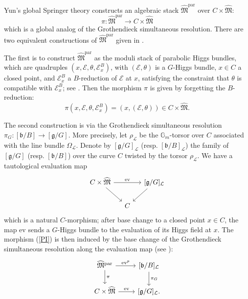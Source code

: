 \documentclass[11pt]{amsart}
\theoremstyle{plain}
\theoremstyle{definition}
\theoremstyle{remark}
\newcommand{\BG}{{\mathbb{G}}}
\newcommand{\CE}{{\mathcal E}}
\newcommand{\CL}{{\mathcal L}}
\newcommand{\FM}{{\mathfrak{M}}}
\begin{document}
Yun's global Springer theory \cite{Yun1} constructs an algebraic stack $\widehat{\FM}^\mathrm{par}$ over $C \times \widehat{\FM}$:
\begin{equation}\label{PI}
\pi: \widehat{\FM}^\mathrm{par} \to C \times \widehat{\FM}
\end{equation}
which is a global analog of the Grothendieck simultaneous resolution. There are two equivalent constructions of $\widehat{\FM}^{\mathrm{par}}$ given in \cite[Section 2.1]{Yun1}. 


The first is to construct $\widehat{\FM}^{\mathrm{par}}$ as the moduli stack of parabolic Higgs bundles, which are quadruples $(x, \CE, \theta, \CE_x^B)$, with $(\CE, \theta)$ is a $G$-Higgs bundle, $x\in C$ a closed point, and $\CE_x^B$ a $B$-reduction of $\CE$ at $x$, satisfying the constraint that $\theta$ is compatible with $\CE_x^B$; see \cite[Definition 2.1.1]{Yun1}. Then the morphism $\pi$ is given by forgetting the $B$-reduction:
\[
\pi (x, \CE, \theta, \CE_x^B)  = (x, (\CE,\theta)) \in C \times \widehat{\FM}.
\]

The second construction is via the Grothendieck simultaneous resolution $\pi_G: [\mathfrak{b}/B] \to [\mathfrak{g}/G]$. More precisely, let $\rho_\CL$ be the $\BG_m$-torsor over $C$ associated with the line bundle $\Omega_\CL$. Denote by $[\mathfrak{g}/G]_\CL$ (resp. $[\mathfrak{b}/B]_\CL$) the family of $[\mathfrak{g}/G]$ (resp. $[\mathfrak{b}/B]$) over the curve $C$ twisted by the torsor $\rho_\CL$. We have a tautological evaluation map
\begin{equation}\label{evaluation}
    \begin{tikzcd}[column sep=small]
    C\times \widehat{\FM} \arrow[dr, ""] \arrow[rr, "\mathrm{ev}"] & & {[\mathfrak{g}/G]_\CL} \arrow[dl, ""] \\
       & C  & 
\end{tikzcd}
\end{equation}
which is a natural $C$-morphism; after base change to a closed point $x\in C$, the map $\mathrm{ev}$ sends a $G$-Higgs bundle to the evaluation of its Higgs field at $x$. The morphism (\ref{PI}) is then induced by the base change of the Grothendieck simultaneous resolution along the evaluation map (see \cite[Lemma 2.1.2]{Yun1}):
\begin{equation*}
\begin{tikzcd}
\widehat{\FM}^{\mathrm{par}} \arrow[r, "\mathrm{ev}^p"] \arrow[d, "\pi"]
&{[\mathfrak{b}/B]_\CL} \arrow[d, "\pi_G"] \\
C\times \widehat{\FM} \arrow[r, "\mathrm{ev}"]
& {[\mathfrak{g}/G]_\CL}.
\end{tikzcd}
\end{equation*}
\end{document}
